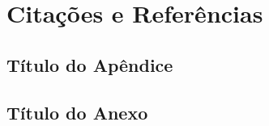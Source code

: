 \documentclass[english]{packages/icmc}
\begin{document}
\chapter{Citações e Referências}
\label{chapter:citacoes}



% 

\postextual





\glsaddall
\printglossaries


\begin{apendicesenv}

    \chapter{Título do Apêndice}
    \label{chapter:tituloapendice}
    

\end{apendicesenv}



\begin{anexosenv}

    \chapter{Título do Anexo} 
    \label{chapter:tituloanexo}
    

\end{anexosenv}
\end{document}
